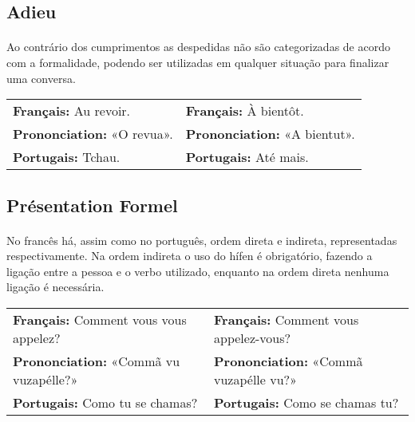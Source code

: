 \documentclass{article}
\begin{document}
    \subsection{Adieu}
        \paragraph{}Ao contrário dos cumprimentos as despedidas não são categorizadas de acordo com a formalidade, podendo ser utilizadas em qualquer situação para finalizar uma conversa.

            \begin{center}
                \begin{tabular}{m{8cm} m{8cm}}
                    \textbf{Français:}      Au revoir. & \textbf{Français:}      À bientôt.\\
                    \textbf{Prononciation:} «O revua». & \textbf{Prononciation:} «A bientut».\\
                    \textbf{Portugais:}     Tchau.     & \textbf{Portugais:}     Até mais.\\    
                \end{tabular}
            \end{center}

    \subsection{Présentation Formel}
        \paragraph{}No francês há, assim como no português, ordem direta e indireta, representadas respectivamente. Na ordem indireta o uso do hífen é obrigatório, fazendo a ligação entre a pessoa e o verbo utilizado, enquanto na ordem direta nenhuma ligação é necessária.
            
            \begin{center}
                \begin{tabular}{m{8cm} m{8cm}}
                    \textbf{Français:}      Comment vous vous appelez? & \textbf{Français:}      Comment vous appelez-vous?\\
                    \textbf{Prononciation:} «Commã vu vuzapélle?»      & \textbf{Prononciation:} «Commã vuzapélle vu?»\\
                    \textbf{Portugais:}     Como tu se chamas?         & \textbf{Portugais:}     Como se chamas tu?\\     
                \end{tabular}
            \end{center}
\end{document}
